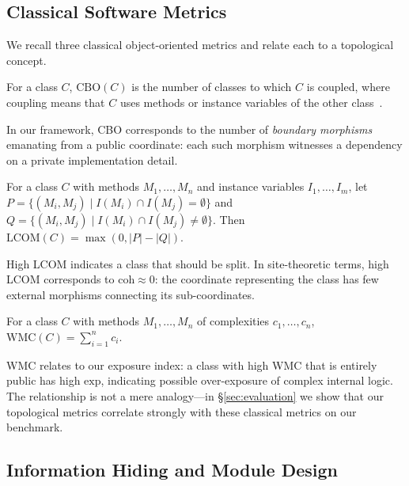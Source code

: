\documentclass[11pt]{article}
\newcommand{\CohIndex}{\mathrm{coh}}
\newcommand{\ExpIndex}{\mathrm{exp}}
\begin{document}
\subsection{Classical Software Metrics}\label{sec:bg-classical}

We recall three classical object-oriented metrics and relate each to a
topological concept.

\begin{definition}\label{def:cbo}
For a class $C$, $\mathrm{CBO}(C)$ is the number of classes to which
$C$ is coupled, where coupling means that $C$ uses methods or instance
variables of the other class~\cite{CK1994}.
\end{definition}

In our framework, CBO corresponds to the number of \emph{boundary morphisms}
emanating from a public coordinate: each such morphism witnesses a
dependency on a private implementation detail.

\begin{definition}\label{def:lcom}
For a class $C$ with methods $M_1, \ldots, M_n$ and instance variables
$I_1, \ldots, I_m$, let $P = \{(M_i, M_j) \mid I(M_i) \cap I(M_j) =
\emptyset\}$ and $Q = \{(M_i, M_j) \mid I(M_i) \cap I(M_j) \neq
\emptyset\}$.  Then $\mathrm{LCOM}(C) = \max(0, |P| - |Q|)$.
\end{definition}

High LCOM indicates a class that should be split.  In site-theoretic
terms, high LCOM corresponds to $\CohIndex \approx 0$: the coordinate
representing the class has few external morphisms connecting its
sub-coordinates.

\begin{definition}\label{def:wmc}
For a class $C$ with methods $M_1, \ldots, M_n$ of complexities
$c_1, \ldots, c_n$, $\mathrm{WMC}(C) = \sum_{i=1}^{n} c_i$.
\end{definition}

WMC relates to our exposure index: a class with high WMC that is
entirely public has high $\ExpIndex$, indicating possible over-exposure
of complex internal logic.  The relationship is not a mere analogy---in
§\ref{sec:evaluation} we show that our topological metrics correlate
strongly with these classical metrics on our benchmark.

\subsection{Information Hiding and Module Design}\label{sec:bg-info-hiding}
\end{document}
